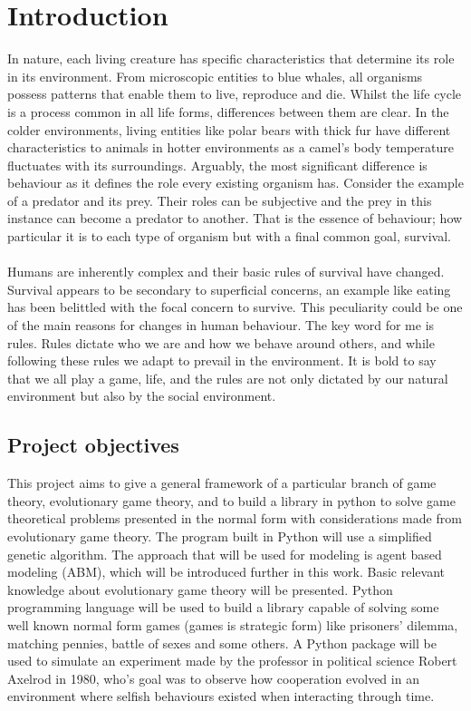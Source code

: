 \section{Introduction}
\label{Intro:Introduction}
In nature, each living creature has specific characteristics that determine its role in its environment.  From microscopic entities to blue whales, all organisms possess patterns that enable them to live, reproduce and die. Whilst the life cycle is  a process common in all life forms, differences between them are clear. In the colder environments, living entities like polar bears with thick fur have different characteristics to animals in hotter environments as a camel's body temperature fluctuates with its surroundings. Arguably, the most significant difference is behaviour as it defines the role every existing organism has. Consider the example of a predator and its prey.  Their roles can be subjective and the prey in this instance can become a predator to another. That is the essence of behaviour; how particular it is to each type of organism but with a final common goal, survival.  
\\\\Humans are inherently complex and their basic rules of survival have changed. Survival appears to be secondary to superficial concerns, an example like eating has been belittled with the focal concern to survive. This peculiarity could be one of the main reasons for changes in human behaviour. The key word for me is rules. Rules dictate who we are and how we behave  around others, and while following these rules we adapt to prevail in the environment.  It is bold to say that we all play a game, life, and the rules are not only dictated by our natural environment but also by the social environment.
\subsection{Project objectives}
This project aims to give a general framework of a particular branch of game theory, evolutionary game theory, and to build a library in python to solve game theoretical problems presented in the normal form with considerations made from evolutionary game theory. The program built in Python will use a simplified genetic algorithm. The approach that will be used for modeling is agent based modeling (ABM), which will be introduced further in this work. Basic relevant knowledge about evolutionary game theory will be presented. Python programming language will be used to build a library capable of solving some well known normal form games (games is strategic form) like prisoners' dilemma, matching pennies, battle of sexes and some others. A Python package will be used to simulate an experiment made by the professor in political science Robert Axelrod in 1980, who's goal was to observe how cooperation evolved in an environment where selfish behaviours existed when interacting through time. 
